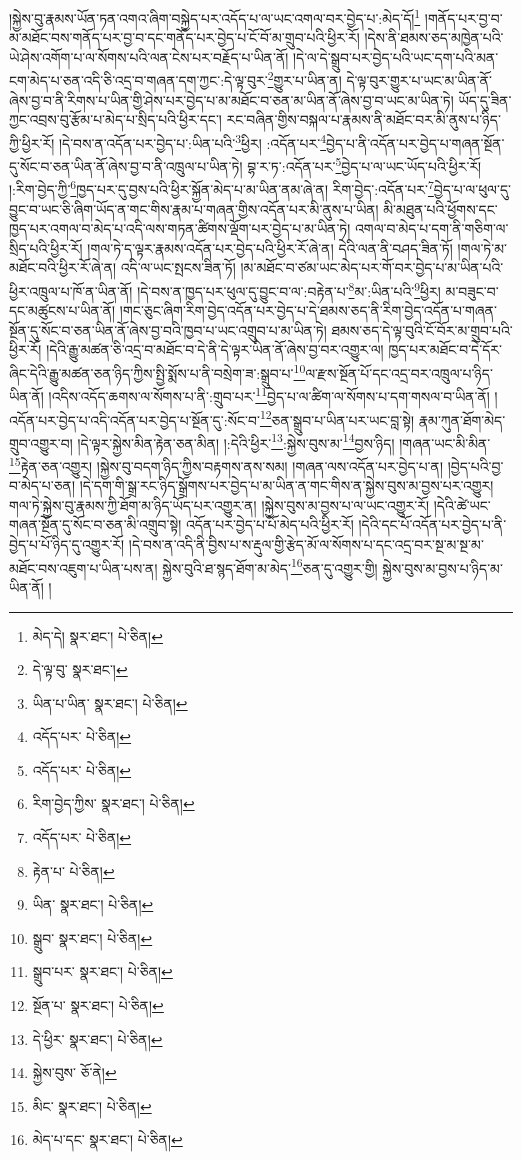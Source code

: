 །སྐྱེས་བུ་རྣམས་ཡོན་ཏན་འགའ་ཞིག་བསྐྱེད་པར་འདོད་པ་ལ་ཡང་འགལ་བར་བྱེད་པ་:མེད་དོ།\footnote{མེད་དེ།  སྣར་ཐང་།  པེ་ཅིན། } །གནོད་པར་བྱ་བ་མ་མཐོང་བས་གནོད་པར་བྱ་བ་དང་གནོད་པར་བྱེད་པ་ངོ་བོ་མ་གྲུབ་པའི་ཕྱིར་རོ། །དེས་ནི་ཐམས་ཅད་མཁྱེན་པའི་ཡེ་ཤེས་འགོག་པ་ལ་སོགས་པའི་ལན་ངེས་པར་བརྗོད་པ་ཡིན་ནོ། །དེ་ལ་དེ་སྒྲུབ་པར་བྱེད་པའི་ཡང་དག་པའི་མན་ངག་མེད་པ་ཅན་འདི་ཅི་འདྲ་བ་གཞན་དག་ཀྱང་:དེ་ལྟ་བུར་\footnote{དེ་ལྟ་བུ་  སྣར་ཐང་། }གྱུར་པ་ཡིན་ན། དེ་ལྟ་བུར་གྱུར་པ་ཡང་མ་ཡིན་ནོ་ཞེས་བྱ་བ་ནི་རིགས་པ་ཡིན་གྱི་ཤེས་པར་བྱེད་པ་མ་མཐོང་བ་ཅན་མ་ཡིན་ནོ་ཞེས་བྱ་བ་ཡང་མ་ཡིན་ཏེ། ཡོད་དུ་ཟིན་ཀྱང་འབྲས་བུ་རྩོམ་པ་མེད་པ་སྲིད་པའི་ཕྱིར་དང་། རང་བཞིན་གྱིས་བསྐལ་པ་རྣམས་ནི་མཐོང་བར་མི་ནུས་པ་ཉིད་ཀྱི་ཕྱིར་རོ། །དེ་བས་ན་འདོན་པར་བྱེད་པ་:ཡིན་པའི་\footnote{ཡིན་པ་ཡིན་  སྣར་ཐང་།  པེ་ཅིན། }ཕྱིར། :འདོན་པར་\footnote{འདོད་པར་  པེ་ཅིན། }བྱེད་པ་ནི་འདོན་པར་བྱེད་པ་གཞན་སྔོན་དུ་སོང་བ་ཅན་ཡིན་ནོ་ཞེས་བྱ་བ་ནི་འཁྲུལ་པ་ཡིན་ཏེ། བྷ་ར་ཏ་:འདོན་པར་\footnote{འདོད་པར་  པེ་ཅིན། }བྱེད་པ་ལ་ཡང་ཡོད་པའི་ཕྱིར་རོ། །:རིག་བྱེད་ཀྱི་\footnote{རིག་བྱེད་ཀྱིས་  སྣར་ཐང་།  པེ་ཅིན། }ཁྱད་པར་དུ་བྱས་པའི་ཕྱིར་སྐྱོན་མེད་པ་མ་ཡིན་ནམ་ཞེ་ན། རིག་བྱེད་:འདོན་པར་\footnote{འདོད་པར་  པེ་ཅིན། }བྱེད་པ་ལ་ཕུལ་དུ་བྱུང་བ་ཡང་ཅི་ཞིག་ཡོད་ན་གང་གིས་རྣམ་པ་གཞན་གྱིས་འདོན་པར་མི་ནུས་པ་ཡིན། མི་མཐུན་པའི་ཕྱོགས་དང་ཁྱད་པར་འགལ་བ་མེད་པ་འདི་ལས་གཏན་ཚིགས་ལྡོག་པར་བྱེད་པ་མ་ཡིན་ཏེ། འགལ་བ་མེད་པ་དག་ནི་གཅིག་ལ་སྲིད་པའི་ཕྱིར་རོ། །གལ་ཏེ་ད་ལྟར་རྣམས་འདོན་པར་བྱེད་པའི་ཕྱིར་རོ་ཞེ་ན། དེའི་ལན་ནི་བཤད་ཟིན་ཏོ། །གལ་ཏེ་མ་མཐོང་བའི་ཕྱིར་རོ་ཞེ་ན། འདི་ལ་ཡང་སྤངས་ཟིན་ཏོ། །མ་མཐོང་བ་ཙམ་ཡང་མེད་པར་གོ་བར་བྱེད་པ་མ་ཡིན་པའི་ཕྱིར་འཁྲུལ་པ་ཁོ་ན་ཡིན་ནོ། །དེ་བས་ན་ཁྱད་པར་ཕུལ་དུ་བྱུང་བ་ལ་:བརྟེན་པ་\footnote{རྟེན་པ་  པེ་ཅིན། }མ་:ཡིན་པའི་\footnote{ཡིན་  སྣར་ཐང་།  པེ་ཅིན། }ཕྱིར། མ་བཟུང་བ་དང་མཚུངས་པ་ཡིན་ནོ། །གང་ཅུང་ཞིག་རིག་བྱེད་འདོན་པར་བྱེད་པ་དེ་ཐམས་ཅད་ནི་རིག་བྱེད་འདོན་པ་གཞན་སྔོན་དུ་སོང་བ་ཅན་ཡིན་ནོ་ཞེས་བྱ་བའི་ཁྱབ་པ་ཡང་འགྲུབ་པ་མ་ཡིན་ཏེ། ཐམས་ཅད་དེ་ལྟ་བུའི་ངོ་བོར་མ་གྲུབ་པའི་ཕྱིར་རོ། །དེའི་རྒྱུ་མཚན་ཅི་འདྲ་བ་མཐོང་བ་དེ་ནི་དེ་ལྟར་ཡིན་ནོ་ཞེས་བྱ་བར་འགྱུར་ལ། ཁྱད་པར་མཐོང་བ་དེ་དོར་ཞིང་དེའི་རྒྱུ་མཚན་ཅན་ཉིད་ཀྱིས་སྤྱི་སྨོས་པ་ནི་བསྲེག་ཟ་:སྒྲུབ་པ་\footnote{སྒྲུབ་  སྣར་ཐང་།  པེ་ཅིན། }ལ་རྫས་སྔོན་པོ་དང་འདྲ་བར་འཁྲུལ་པ་ཉིད་ཡིན་ནོ། །འདིས་འདོད་ཆགས་ལ་སོགས་པ་ནི་:གྲུབ་པར་\footnote{སྒྲུབ་པར་  སྣར་ཐང་།  པེ་ཅིན། }བྱེད་པ་ལ་ཚིག་ལ་སོགས་པ་དག་གསལ་བ་ཡིན་ནོ། །འདོན་པར་བྱེད་པ་འདི་འདོན་པར་བྱེད་པ་སྔོན་དུ་:སོང་བ་\footnote{སྔོན་པ་  སྣར་ཐང་།  པེ་ཅིན། }ཅན་སྒྲུབ་པ་ཡིན་པར་ཡང་བླ་སྟེ། རྣམ་ཀུན་ཐོག་མེད་གྲུབ་འགྱུར་བ། །དེ་ལྟར་སྐྱེས་མིན་རྟེན་ཅན་མིན། །:དེའི་ཕྱིར་\footnote{དེ་ཕྱིར་  སྣར་ཐང་།  པེ་ཅིན། }:སྐྱེས་བུས་མ་\footnote{སྐྱེས་བུས་  ཅོ་ནེ། }བྱས་ཉིད། །གཞན་ཡང་མི་མིན་\footnote{མིང་  སྣར་ཐང་།  པེ་ཅིན། }རྟེན་ཅན་འགྱུར། །སྐྱེས་བུ་བདག་ཉིད་ཀྱིས་བརྟགས་ནས་སམ། །གཞན་ལས་འདོན་པར་བྱེད་པ་ན། །བྱེད་པའི་བྱ་བ་མེད་པ་ཅན། །དེ་དག་གི་སྒྲ་རང་ཉིད་སྒྲོགས་པར་བྱེད་པ་མ་ཡིན་ན་གང་གིས་ན་སྐྱེས་བུས་མ་བྱས་པར་འགྱུར། གལ་ཏེ་སྐྱེས་བུ་རྣམས་ཀྱི་ཐོག་མ་ཉིད་ཡོད་པར་འགྱུར་ན། །སྐྱེས་བུས་མ་བྱས་པ་ལ་ཡང་འགྱུར་རོ། །དེའི་ཚེ་ཡང་གཞན་སྔོན་དུ་སོང་བ་ཅན་མི་འགྲུབ་སྟེ། འདོན་པར་བྱེད་པ་པོ་མེད་པའི་ཕྱིར་རོ། །དེའི་དང་པོ་འདོན་པར་བྱེད་པ་ནི་བྱེད་པ་པོ་ཉིད་དུ་འགྱུར་རོ། །དེ་བས་ན་འདི་ནི་བྱིས་པ་ས་རྡུལ་གྱི་རྩེད་མོ་ལ་སོགས་པ་དང་འདྲ་བར་སྔ་མ་སྔ་མ་མཐོང་བས་འཇུག་པ་ཡིན་པས་ན། སྐྱེས་བུའི་ཐ་སྙད་ཐོག་མ་མེད་\footnote{མེད་པ་དང་  སྣར་ཐང་།  པེ་ཅིན། }ཅན་དུ་འགྱུར་གྱི། སྐྱེས་བུས་མ་བྱས་པ་ཉིད་མ་ཡིན་ནོ། །
